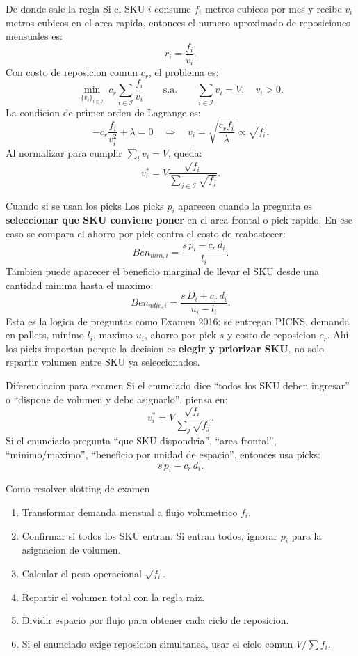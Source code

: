 \begin{definicion}{De donde sale la regla}
Si el SKU \(i\) consume \(f_i\) metros cubicos por mes y recibe \(v_i\) metros cubicos en el area rapida, entonces el numero aproximado de reposiciones mensuales es:
\[
r_i=\frac{f_i}{v_i}.
\]
Con costo de reposicion comun \(c_r\), el problema es:
\[
\min_{\{v_i\}_{i\in\mathcal{I}}}\ c_r\sum_{i\in\mathcal{I}}\frac{f_i}{v_i}
\qquad
\text{s.a.}\qquad
\sum_{i\in\mathcal{I}}v_i=V,\quad v_i>0.
\]
La condicion de primer orden de Lagrange es:
\[
-c_r\frac{f_i}{v_i^2}+\lambda=0
\quad\Rightarrow\quad
v_i=\sqrt{\frac{c_r f_i}{\lambda}}\propto \sqrt{f_i}.
\]
Al normalizar para cumplir \(\sum_i v_i=V\), queda:
\[
v_i^*=V\frac{\sqrt{f_i}}{\sum_{j\in\mathcal{I}}\sqrt{f_j}}.
\]
\end{definicion}

\begin{formulas}{Cuando si se usan los picks}
Los picks \(p_i\) aparecen cuando la pregunta es \textbf{seleccionar que SKU conviene poner} en el area frontal o pick rapido. En ese caso se compara el ahorro por pick contra el costo de reabastecer:
\[
Ben_{min,i}=\frac{s\,p_i-c_r\,d_i}{l_i}.
\]
Tambien puede aparecer el beneficio marginal de llevar el SKU desde una cantidad minima hasta el maximo:
\[
Ben_{adic,i}=\frac{s\,D_i+c_r\,d_i}{u_i-l_i}.
\]
Esta es la logica de preguntas como Examen 2016: se entregan \(\text{PICKS}\), demanda en pallets, minimo \(l_i\), maximo \(u_i\), ahorro por pick \(s\) y costo de reposicion \(c_r\). Ahi los picks importan porque la decision es \textbf{elegir y priorizar SKU}, no solo repartir volumen entre SKU ya seleccionados.
\end{formulas}

\begin{trampa}{Diferenciacion para examen}
Si el enunciado dice ``todos los SKU deben ingresar'' o ``dispone de volumen y debe asignarlo'', piensa en:
\[
v_i^*=V\frac{\sqrt{f_i}}{\sum_j\sqrt{f_j}}.
\]
Si el enunciado pregunta ``que SKU dispondria'', ``area frontal'', ``minimo/maximo'', ``beneficio por unidad de espacio'', entonces usa picks:
\[
s\,p_i-c_r\,d_i.
\]
\end{trampa}

\begin{algoritmo}{Como resolver slotting de examen}
\begin{enumerate}
    \item Transformar demanda mensual a flujo volumetrico \(f_i\).
    \item Confirmar si todos los SKU entran. Si entran todos, ignorar \(p_i\) para la asignacion de volumen.
    \item Calcular el peso operacional \(\sqrt{f_i}\).
    \item Repartir el volumen total con la regla raiz.
    \item Dividir espacio por flujo para obtener cada ciclo de reposicion.
    \item Si el enunciado exige reposicion simultanea, usar el ciclo comun \(V/\sum f_i\).
\end{enumerate}
\end{algoritmo}
